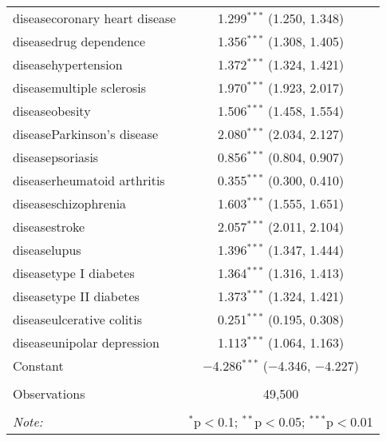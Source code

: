 \begin{table}[!htbp]
\begin{tabular}{@{\extracolsep{5pt}}lc}
  diseasecoronary heart disease & 1.299$^{***}$ (1.250, 1.348) \\ 
  diseasedrug dependence & 1.356$^{***}$ (1.308, 1.405) \\ 
  diseasehypertension & 1.372$^{***}$ (1.324, 1.421) \\ 
  diseasemultiple sclerosis & 1.970$^{***}$ (1.923, 2.017) \\ 
  diseaseobesity & 1.506$^{***}$ (1.458, 1.554) \\ 
  diseaseParkinson's disease & 2.080$^{***}$ (2.034, 2.127) \\ 
  diseasepsoriasis & 0.856$^{***}$ (0.804, 0.907) \\ 
  diseaserheumatoid arthritis & 0.355$^{***}$ (0.300, 0.410) \\ 
  diseaseschizophrenia & 1.603$^{***}$ (1.555, 1.651) \\ 
  diseasestroke & 2.057$^{***}$ (2.011, 2.104) \\ 
  diseaselupus & 1.396$^{***}$ (1.347, 1.444) \\ 
  diseasetype I diabetes & 1.364$^{***}$ (1.316, 1.413) \\ 
  diseasetype II diabetes & 1.373$^{***}$ (1.324, 1.421) \\ 
  diseaseulcerative colitis & 0.251$^{***}$ (0.195, 0.308) \\ 
  diseaseunipolar depression & 1.113$^{***}$ (1.064, 1.163) \\ 
  Constant & $-$4.286$^{***}$ ($-$4.346, $-$4.227) \\ 
 \hline \\[-1.8ex] 
Observations & 49,500 \\ 
\hline 
\hline \\[-1.8ex] 
\textit{Note:}  & \multicolumn{1}{r}{$^{*}$p$<$0.1; $^{**}$p$<$0.05; $^{***}$p$<$0.01} \\ 
\end{tabular} 
\end{table} 
